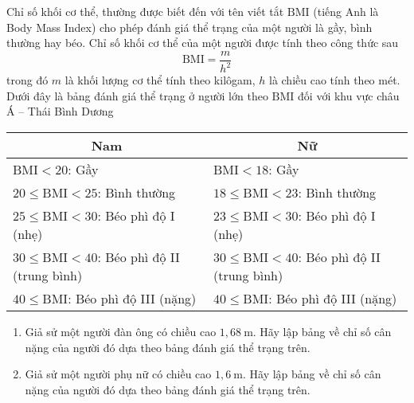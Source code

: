 \begin{bt}
	Chỉ số khối cơ thể, thường được biết đến với tên viết tắt $\mathrm{BMI}$ (tiếng Anh là Body Mass Index) cho phép đánh giá thể trạng của một người là gầy, bình thường hay béo. Chỉ số khối cơ thể của một người được tính theo công thức sau
	\[\mathrm{BMI} =\dfrac{m}{h^2}\]
	trong đó $m$ là khối lượng cơ thể tính theo kilôgam, $h$ là chiều cao tính theo mét.\\
	Dưới đây là bảng đánh giá thể trạng ở người lớn theo $\mathrm{BMI}$ đối với khu vực châu Á -- Thái Bình Dương
	\begin{center}
	\begin{tabular}{|l|l|}
	\hline \multicolumn{1}{|c|}{ Nam } & \multicolumn{1}{|c|}{ Nữ } \\
	\hline $\mathrm{BMI} < 20$: Gầy & $\mathrm{BMI} < 18$: Gầy \\
	$20 \leq \mathrm{BMI} < 25$: Bình thường & $18 \leq \mathrm{BMI} <23$: Bình thường \\
	$25 \leq \mathrm{BMI} < 30$: Béo phì độ I (nhẹ) & $23 \leq \mathrm{BMI} <30$: Béo phì độ I (nhẹ) \\
	$30 \leq \mathrm{BMI} < 40$: Béo phì độ II (trung bình) & $30 \leq \mathrm{BMI} <40$: Béo phì độ II (trung bình) \\
	$40 \leq \mathrm{BMI}$: Béo phì độ III (nặng) & $40 \leq \mathrm{BMI}$: Béo phì độ III (nặng) \\
	\hline
	\end{tabular}
	\end{center}
	\begin{enumerate}
	\item Giả sử một người đàn ông có chiều cao $1{,}68~\mathrm{m}$. Hãy lập bảng về chỉ số cân nặng của người đó dựa theo bảng đánh giá thể trạng trên.
	\item Giả sử một người phụ nữ có chiều cao $1{,}6~\mathrm{m}$. Hãy lập bảng về chỉ số cân nặng của người đó dựa theo bảng đánh giá thể trạng trên.
	\end{enumerate}
\end{bt}
